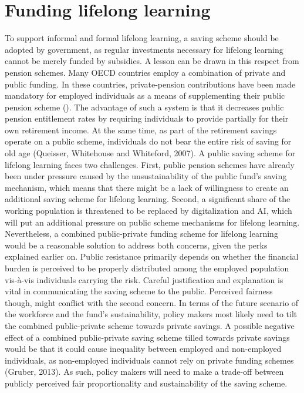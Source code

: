 \section*{Funding lifelong learning}

To support informal and formal lifelong learning, a saving scheme should be adopted by government, as regular investments necessary for lifelong learning cannot be merely funded by subsidies. A lesson can be drawn in this respect from pension schemes. Many OECD countries employ a combination of private and public funding. In these countries, private-pension contributions have been made mandatory for employed individuals as a means of supplementing their public pension scheme (\citealt{antolin2009filling}). The advantage of such a system is that it decreases public pension entitlement rates by requiring individuals to provide partially for their own retirement income. At the same time, as part of the retirement savings operate on a public scheme, individuals do not bear the entire risk of saving for old age (Queisser, Whitehouse and Whiteford, 2007). A public saving scheme for lifelong learning faces two challenges. First, public pension schemes have already been under pressure caused by the unsustainability of the public fund’s saving mechanism, which means that there might be a lack of willingness to create an additional saving scheme for lifelong learning. Second, a significant share of the working population is threatened to be replaced by digitalization and AI, which will put an additional pressure on public scheme mechanisms for lifelong learning. Nevertheless, a combined public-private funding scheme for lifelong learning would be a reasonable solution to address both concerns, given the perks explained earlier on. Public resistance primarily depends on whether the financial burden is perceived to be properly distributed among the employed population vis-à-vis individuals carrying the risk. Careful justification and explanation is vital in communicating the saving scheme to the public. Perceived fairness though, might conflict with the second concern. In terms of the future scenario of the workforce and the fund’s sustainability, policy makers most likely need to tilt the combined public-private scheme towards private savings. A possible negative effect of a combined public-private saving scheme tilled towards private savings would be that it could cause inequality between employed and non-employed individuals, as non-employed individuals cannot rely on private funding schemes (Gruber, 2013). As such, policy makers will need to make a trade-off between publicly perceived fair proportionality and sustainability of the saving scheme. 

